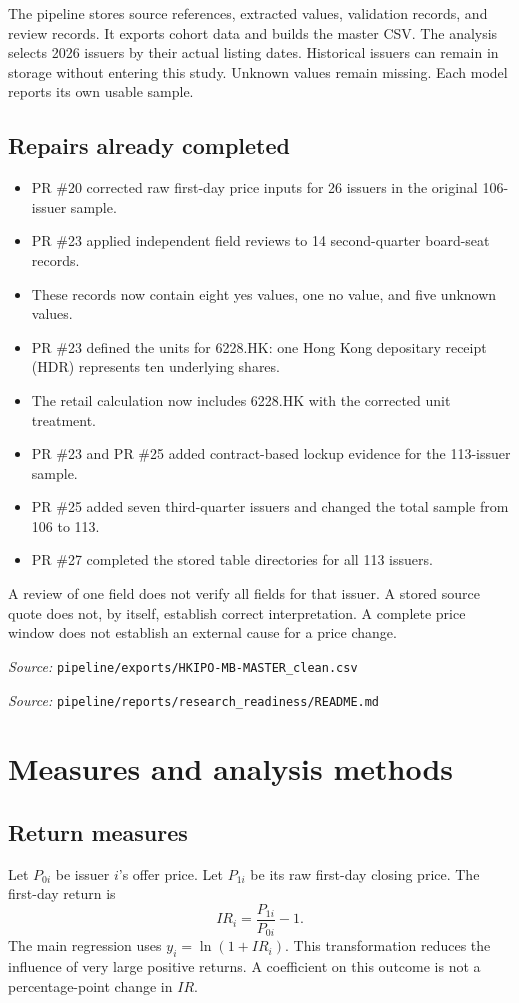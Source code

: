 \documentclass[11pt,a4paper]{article}
\newcommand{\src}[1]{\par{\footnotesize\textit{Source:} \nolinkurl{#1}}}
\begin{document}
The pipeline stores source references, extracted values, validation records, and review records.
It exports cohort data and builds the master CSV.
The analysis selects 2026 issuers by their actual listing dates.
Historical issuers can remain in storage without entering this study.
Unknown values remain missing.
Each model reports its own usable sample.

\subsection{Repairs already completed}
\begin{itemize}
\item PR \#20 corrected raw first-day price inputs for 26 issuers in the original 106-issuer sample.
\item PR \#23 applied independent field reviews to 14 second-quarter board-seat records.
\item These records now contain eight yes values, one no value, and five unknown values.
\item PR \#23 defined the units for 6228.HK: one Hong Kong depositary receipt (HDR) represents ten underlying shares.
\item The retail calculation now includes 6228.HK with the corrected unit treatment.
\item PR \#23 and PR \#25 added contract-based lockup evidence for the 113-issuer sample.
\item PR \#25 added seven third-quarter issuers and changed the total sample from 106 to 113.
\item PR \#27 completed the stored table directories for all 113 issuers.
\end{itemize}

A review of one field does not verify all fields for that issuer.
A stored source quote does not, by itself, establish correct interpretation.
A complete price window does not establish an external cause for a price change.

\src{pipeline/exports/HKIPO-MB-MASTER_clean.csv}
\src{pipeline/reports/research_readiness/README.md}

\newpage
\section{Measures and analysis methods}
\subsection{Return measures}
Let $P_{0i}$ be issuer $i$'s offer price.
Let $P_{1i}$ be its raw first-day closing price.
The first-day return is
\begin{equation}
IR_i=\frac{P_{1i}}{P_{0i}}-1.
\end{equation}
The main regression uses $y_i=\ln(1+IR_i)$.
This transformation reduces the influence of very large positive returns.
A coefficient on this outcome is not a percentage-point change in $IR$.
\end{document}
